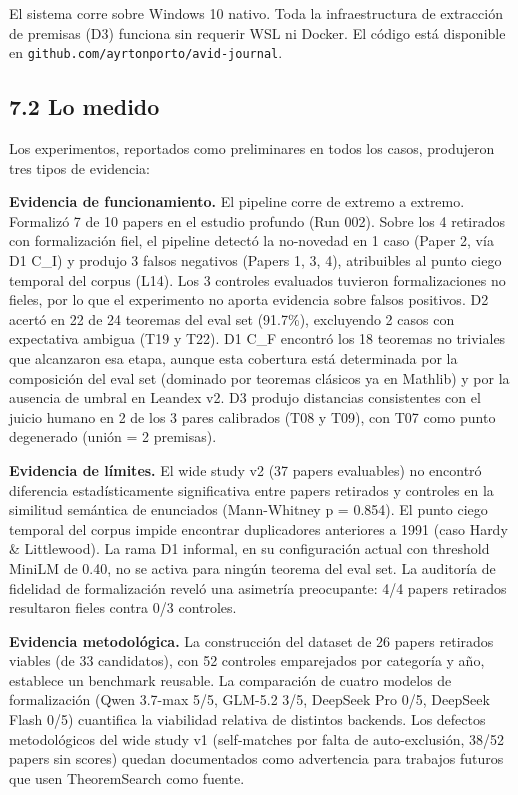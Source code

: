 \documentclass[12pt,a4paper]{article}
\theoremstyle{remark}
\begin{document}
El sistema corre sobre Windows 10 nativo. Toda la infraestructura de extracción de premisas (D3) funciona sin requerir WSL ni Docker. El código está disponible en \texttt{github.com/ayrtonporto/avid-journal}.


\subsection{7.2 Lo medido}

Los experimentos, reportados como preliminares en todos los casos, produjeron tres tipos de evidencia:

\textbf{Evidencia de funcionamiento.} El pipeline corre de extremo a extremo. Formalizó 7 de 10 papers en el estudio profundo (Run 002). Sobre los 4 retirados con formalización fiel, el pipeline detectó la no-novedad en 1 caso (Paper 2, vía D1 C\_I) y produjo 3 falsos negativos (Papers 1, 3, 4), atribuibles al punto ciego temporal del corpus (L14). Los 3 controles evaluados tuvieron formalizaciones no fieles, por lo que el experimento no aporta evidencia sobre falsos positivos. D2 acertó en 22 de 24 teoremas del eval set (91.7\%), excluyendo 2 casos con expectativa ambigua (T19 y T22). D1 C\_F encontró los 18 teoremas no triviales que alcanzaron esa etapa, aunque esta cobertura está determinada por la composición del eval set (dominado por teoremas clásicos ya en Mathlib) y por la ausencia de umbral en Leandex v2. D3 produjo distancias consistentes con el juicio humano en 2 de los 3 pares calibrados (T08 y T09), con T07 como punto degenerado (unión = 2 premisas).

\textbf{Evidencia de límites.} El wide study v2 (37 papers evaluables) no encontró diferencia estadísticamente significativa entre papers retirados y controles en la similitud semántica de enunciados (Mann-Whitney p = 0.854). El punto ciego temporal del corpus impide encontrar duplicadores anteriores a 1991 (caso Hardy \& Littlewood). La rama D1 informal, en su configuración actual con threshold MiniLM de 0.40, no se activa para ningún teorema del eval set. La auditoría de fidelidad de formalización reveló una asimetría preocupante: 4/4 papers retirados resultaron fieles contra 0/3 controles.

\textbf{Evidencia metodológica.} La construcción del dataset de 26 papers retirados viables (de 33 candidatos), con 52 controles emparejados por categoría y año, establece un benchmark reusable. La comparación de cuatro modelos de formalización (Qwen 3.7-max 5/5, GLM-5.2 3/5, DeepSeek Pro 0/5, DeepSeek Flash 0/5) cuantifica la viabilidad relativa de distintos backends. Los defectos metodológicos del wide study v1 (self-matches por falta de auto-exclusión, 38/52 papers sin scores) quedan documentados como advertencia para trabajos futuros que usen TheoremSearch como fuente.
\end{document}
